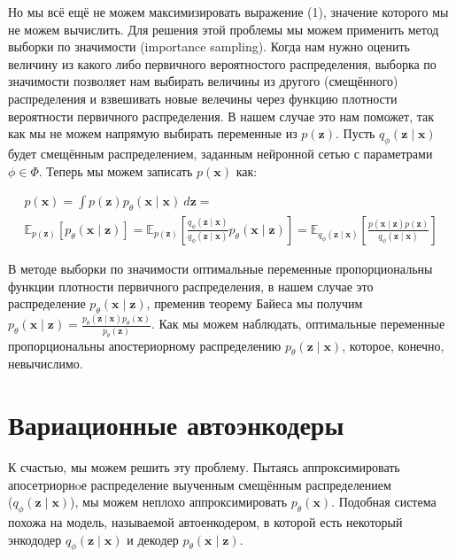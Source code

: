 \documentclass[a4paper]{report}
\begin{document}
Но мы всё ещё не можем максимизировать выражение (1), значение которого мы не можем вычислить. Для решения этой проблемы мы можем применить метод
выборки по значимости (importance sampling). Когда нам нужно оценить величину из какого либо первичного вероятностого распределения, выборка по
значимости позволяет нам выбирать величины из другого (смещённого) распределения и взвешивать новые велечины через функцию плотности вероятности 
первичного распределения. В нашем случае это нам поможет, так как мы не можем напрямую выбирать переменные из $p(\mathbf{z})$. Пусть $q_\phi(\mathbf{z} \mid \mathbf{x})$ 
будет смещённым распределением, заданным нейронной сетью с параметрами $\phi \in \Phi$. Теперь мы можем записать $p(\mathbf{x})$ как:

\begin{gather*}
    p(\mathbf{x}) = \int p(\mathbf{z})p_\theta(\mathbf{x} \mid \mathbf{x})~d\mathbf{z} =\\
        \mathbb{E}_{p(\mathbf{z})} \left[p_{\theta}(\mathbf{x} \mid \mathbf{z})\right] = 
        \mathbb{E}_{p(\mathbf{z})} \left[\frac{q_\phi(\mathbf{z} \mid \mathbf{x})}{q_\phi(\mathbf{z} \mid \mathbf{x})}p_{\theta}(\mathbf{x} \mid \mathbf{z})\right] =
        \mathbb{E}_{q_\phi(\mathbf{z} \mid \mathbf{x})} \left[\frac{p(\mathbf{x} \mid \mathbf{z})p(\mathbf{z})}{q_\phi(\mathbf{z} \mid \mathbf{x})}\right]
    \tag{3}
\end{gather*}

В методе выборки по значимости оптимальные переменные пропорциональны функции плотности первичного распределения, в нашем случае это распределение
$p_\theta(\mathbf{x} \mid \mathbf{z})$, пременив теорему Байеса мы получим $p_\theta(\mathbf{x} \mid \mathbf{z}) 
= \frac{p_\theta(\mathbf{z} \mid \mathbf{x}) p_\theta(\mathbf{x})}{p_\theta(\mathbf{z})}$. Как мы можем наблюдать, оптимальные переменные пропорциональны
апостериорному распределению $p_\theta(\mathbf{z} \mid \mathbf{x})$, которое, конечно, невычислимо.

\section{Вариационные автоэнкодеры}
К счастью, мы можем решить эту проблему. Пытаясь аппроксимировать апосетриорнoе распределение выученным смещённым распределением\\ 
($q_\phi(\mathbf{z} \mid \mathbf{x})$), мы можем неплохо аппроксимировать $p_\theta(\mathbf{x})$. Подобная система похожа на модель, называемой
автоенкодером, в которой есть некоторый энкододер $q_\phi(\mathbf{z} \mid \mathbf{x})$ и декодер $p_\theta(\mathbf{x} \mid \mathbf{z})$.
\end{document}
